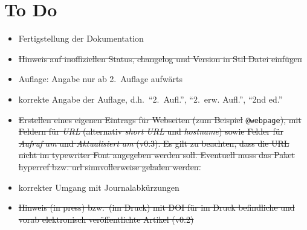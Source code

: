 \documentclass[a4paper,10pt]{scrartcl}
\begin{document}
\section{To Do}
\begin{itemize}
 \item Fertigstellung der Dokumentation
 \item \sout{Hinweis auf inoffiziellen Status, changelog und Version in Stil
Datei
einfügen}
 \item Auflage: Angabe nur ab 2.~Auflage aufwärts
 \item korrekte Angabe der Auflage, d.h.\ "`2.~Aufl."', "`2.~erw. Aufl."', "`2nd
ed."'
 \item \sout{Erstellen eines eigenen Eintrags für Webseiten (zum Beispiel}
\verb|@webpage|\sout{), mit Feldern für \emph{URL} (alternativ \emph{short URL}
und
\emph{hostname}) sowie Felder für \emph{Aufruf am} und
\emph{Aktualisiert am} (v0.3). Es gilt zu
beachten,
dass die URL nicht im typewriter Font angegeben werden soll. Eventuell muss das
Paket hyperref bzw. url sinnvollerweise geladen werden.}
\item korrekter Umgang mit Journalabkürzungen
\item \sout{Hinweis (in press) bzw.\ (im Druck) mit DOI f\"ur im Druck
befindliche und
vorab elektronisch ver\"offentlichte Artikel (v0.2)}
\end{itemize}


\newpage
\label{sec:Literaturverzeichnis}

\nocite{*}

%
\end{document}
